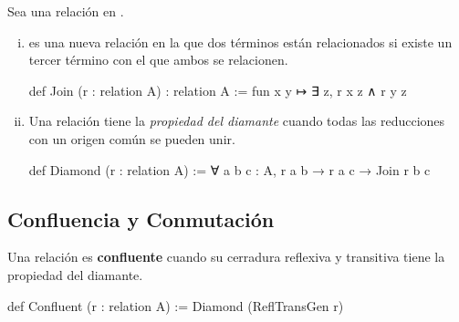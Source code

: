 \begin{defn}
Sea  una relación en .
\begin{enumerate}[(i)]
\item {} es una nueva relación en la que 
dos términos están relacionados 
si existe un tercer término con el que ambos se relacionen.

\begin{leancode}
def Join (r : relation A) : relation A := fun x y ↦ ∃ z, r x z ∧ r y z
\end{leancode}

\item Una relación tiene la \textit{propiedad del diamante}
cuando todas las reducciones con un origen común se pueden unir.

\begin{center}
\end{center}

\begin{leancode}
def Diamond (r : relation A) := ∀ {a b c : A}, r a b → r a c → Join r b c
\end{leancode}
\end{enumerate}
\end{defn}

\subsection{Confluencia y Conmutación}

\begin{defn}
 Una relación es \textbf{confluente} cuando su cerradura 
 reflexiva y transitiva tiene la propiedad del diamante.

 \begin{center}
\end{center}

\begin{leancode}
def Confluent (r : relation A) := Diamond (ReflTransGen r)
\end{leancode}
\end{defn}

